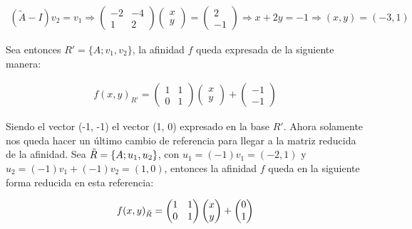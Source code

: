 \begin{gather*}
    (\widetilde{A} - I)v_2 = v_1 \Longrightarrow
    \begin{pmatrix}
    -2 & -4\\
    1 & 2
    \end{pmatrix}
    \begin{pmatrix}
    x\\ y
    \end{pmatrix}
    =
    \begin{pmatrix}
    2\\ -1
    \end{pmatrix}
    \Longrightarrow x + 2y = -1 \Longrightarrow (x,y) = (-3, 1)
\end{gather*}

Sea entonces $R' = \{A; v_1, v_2\}$, la afinidad $f$ queda expresada de la siguiente manera:

\begin{gather*}
    f(x,y)_{R'} = 
    \begin{pmatrix}
    1 & 1\\
    0 & 1
    \end{pmatrix}
    \begin{pmatrix}
    x \\ y
    \end{pmatrix}
    +
    \begin{pmatrix}
    -1 \\ -1
    \end{pmatrix}
\end{gather*}

Siendo el vector (-1, -1) el vector (1, 0) expresado en la base $R'$. Ahora solamente nos queda hacer un último cambio de referencia para llegar a la matriz reducida de la afinidad. Sea $\Tilde{R} = \{A; u_1, u_2\}$, con $u_1 = (-1)v_1 = (-2, 1)$ y $u_2 = (-1)v_1 + (-1)v_2 = (1, 0)$, entonces la afinidad $f$ queda en la siguiente forma reducida en esta referencia:

\begin{gather}
    f(x, y)_{\Tilde{R}} = 
    \begin{pmatrix}
    1 & 1\\
    0 & 1
    \end{pmatrix}
    \begin{pmatrix}
    x\\ y
    \end{pmatrix}
    +
    \begin{pmatrix}
    0 \\ 1
    \end{pmatrix}
\end{gather}

